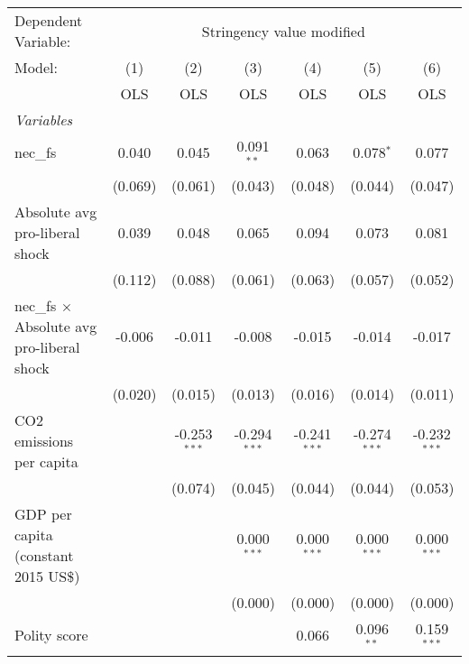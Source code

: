 
\begingroup
\centering
\begin{tabular}{lcccccc}
   \toprule
   Dependent Variable: & \multicolumn{6}{c}{Stringency value modified}\\
   Model:                                            & (1)     & (2)            & (3)            & (4)            & (5)            & (6)\\  
                                                     &  OLS    & OLS            & OLS            & OLS            & OLS            & OLS\\  
   \midrule
   \emph{Variables}\\
   nec\_fs                                           & 0.040   & 0.045          & 0.091$^{**}$   & 0.063          & 0.078$^{*}$    & 0.077\\   
                                                     & (0.069) & (0.061)        & (0.043)        & (0.048)        & (0.044)        & (0.047)\\   
   Absolute avg pro-liberal shock                    & 0.039   & 0.048          & 0.065          & 0.094          & 0.073          & 0.081\\   
                                                     & (0.112) & (0.088)        & (0.061)        & (0.063)        & (0.057)        & (0.052)\\   
   nec\_fs $\times$ Absolute avg pro-liberal shock   & -0.006  & -0.011         & -0.008         & -0.015         & -0.014         & -0.017\\   
                                                     & (0.020) & (0.015)        & (0.013)        & (0.016)        & (0.014)        & (0.011)\\   
   CO2 emissions per capita                          &         & -0.253$^{***}$ & -0.294$^{***}$ & -0.241$^{***}$ & -0.274$^{***}$ & -0.232$^{***}$\\   
                                                     &         & (0.074)        & (0.045)        & (0.044)        & (0.044)        & (0.053)\\   
   GDP per capita (constant 2015 US\$)               &         &                & 0.000$^{***}$  & 0.000$^{***}$  & 0.000$^{***}$  & 0.000$^{***}$\\   
                                                     &         &                & (0.000)        & (0.000)        & (0.000)        & (0.000)\\   
   Polity score                                      &         &                &                & 0.066          & 0.096$^{**}$   & 0.159$^{***}$\\   

\end{tabular}
